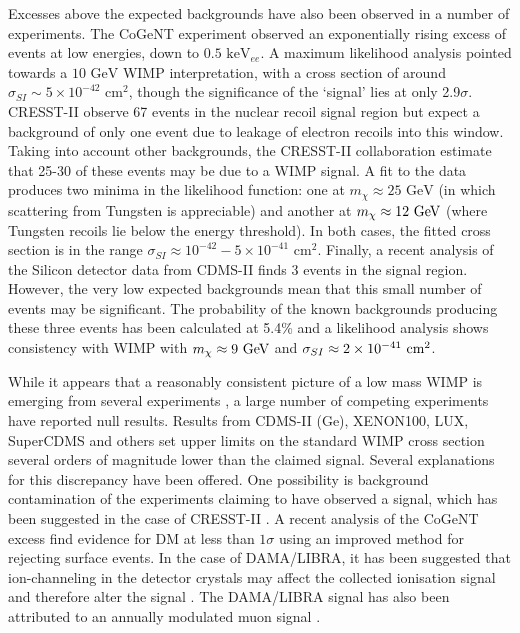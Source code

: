 Excesses above the expected backgrounds have also been observed in a number of experiments.%
The CoGeNT experiment observed an exponentially rising excess of events at low energies, down to $0.5 \textrm{ keV}_{ee}$. A maximum likelihood analysis \cite{Aalseth:2014b} pointed towards a $10 \textrm{ GeV}$ WIMP interpretation, with a cross section of around $\sigma_{SI} \sim 5 \times 10^{-42} \textrm{ cm}^2$, though the significance of the `signal' lies at only 2.9$\sigma$. CRESST-II \cite{Angloher:2012} observe 67 events in the nuclear recoil signal region but expect a background of only one event due to leakage of electron recoils into this window. Taking into account other backgrounds, the CRESST-II collaboration estimate that 25-30 of these events may be due to a WIMP signal. A fit to the data produces two minima in the likelihood function: one at $m_\chi \approx 25 \textrm{ GeV}$ (in which scattering from Tungsten is appreciable) and another at $m_\chi \approx 12 \textrm{ GeV}$ (where Tungsten recoils lie below the energy threshold). In both cases, the fitted cross section is in the range $\sigma_{SI} \approx 10^{-42} - 5 \times 10^{-41} \textrm{ cm}^2$. Finally, a recent analysis of the Silicon detector data from CDMS-II  \cite{Agnese:2013} finds 3 events in the signal region. However, the very low expected backgrounds mean that this small number of events may be significant. The probability of the known backgrounds producing these three events has been calculated at 5.4\% and a likelihood analysis shows consistency with WIMP with $m_\chi \approx 9 \textrm{ GeV}$ and $\sigma_{SI} \approx 2 \times 10^{-41} \textrm{ cm}^2$.

While it appears that a reasonably consistent picture of a low mass WIMP is emerging from several experiments \cite{Hooper:2010}, a large number of competing experiments have reported null results. Results from CDMS-II (Ge), XENON100, LUX, SuperCDMS \cite{Agnese:2014} and others set upper limits on the standard WIMP cross section several orders of magnitude lower than the claimed signal. Several explanations for this discrepancy have been offered. One possibility is background contamination of the experiments claiming to have observed a signal, which has been suggested in the case of CRESST-II \cite{Kuzniak:2012}. A recent analysis of the CoGeNT excess \cite{Davis:2014} find evidence for DM at less than $1\sigma$ using an improved method for rejecting surface events. In the case of DAMA/LIBRA, it has been suggested that ion-channeling in the detector crystals may affect the collected ionisation signal and therefore alter the signal \cite{Bozorgnia:2010}. The DAMA/LIBRA signal has also been attributed to an annually modulated muon signal \cite{Blum:2011,Bernabei:2012}.

